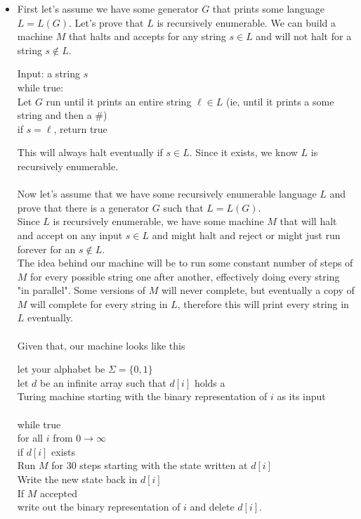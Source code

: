 \documentclass[11pt]{article}
\begin{document}
\begin{solution}
\begin{itemize}
        \item First let's assume we have some generator $G$ that prints some language $L = L(G)$. Let's prove that $L$ is recursively enumerable. 
            We can build a machine $M$ that halts and accepts for any string $s \in L$ and will not halt for a string $s \not \in L$.
            \begin{algo}
                Input: a string $s$
                \\ while true: \+
                \\ Let $G$ run until it prints an entire string $\ell \in L$ (ie, until it prints a some string and then a \#)
                \\ if $s = \ell$, return true
            \end{algo}
            This will always halt eventually if $s \in L$. Since it exists, we know $L$ is recursively enumerable.
            \\ \\ Now let's assume that we have some recursively enumerable language $L$ and prove that there is a generator $G$ such that $L = L(G)$.
            \\ Since $L$ is recursively enumerable, we have some machine $M$ that will halt and accept on any input $s \in L$ and might halt and reject or might just run forever for an $s \not \in L$.
            \\ The idea behind our machine will be to run some constant number of steps of $M$ for every possible string one after another, effectively doing every string "in parallel". Some versions of 
            $M$ will never complete, but eventually a copy of $M$ will complete for every string in $L$, therefore this will print every string in $L$ eventually.
            \\ \\ Given that, our machine looks like this
            \begin{algo}
                let your alphabet be $\Sigma = \{0, 1\}$
                \\ let $d$ be an infinite array such that $d[i]$ holds a 
                \\ Turing machine starting with the binary representation of $i$ as its input
                \\ \\ while true \+
                \\ for all $i$ from $0 \rightarrow \infty$ \+
                \\ if $d[i]$ exists \+
                \\ Run $M$ for 30 steps starting with the state written at $d[i]$ 
                \\ Write the new state back in $d[i]$
                \\ If $M$ accepted \+
                \\ write out the binary representation of $i$ and delete $d[i]$.
            \end{algo}
    \end{itemize}
\end{solution}
\end{document}
